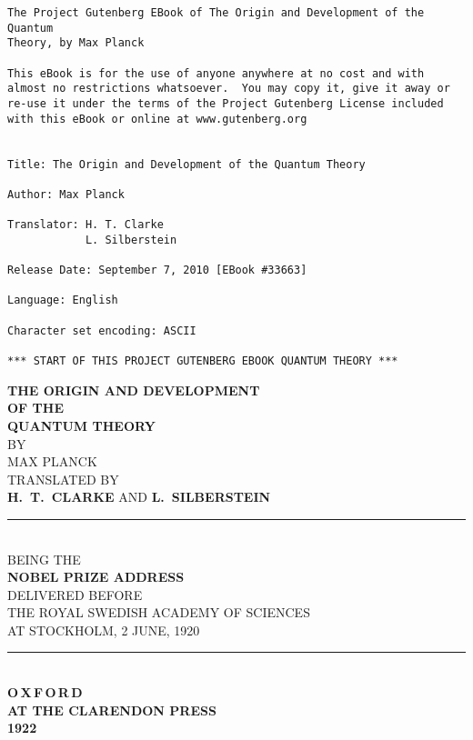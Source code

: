 \documentclass[12pt,oneside]{book}
\begin{document}

\begin{verbatim}
The Project Gutenberg EBook of The Origin and Development of the Quantum
Theory, by Max Planck

This eBook is for the use of anyone anywhere at no cost and with
almost no restrictions whatsoever.  You may copy it, give it away or
re-use it under the terms of the Project Gutenberg License included
with this eBook or online at www.gutenberg.org


Title: The Origin and Development of the Quantum Theory

Author: Max Planck

Translator: H. T. Clarke
            L. Silberstein

Release Date: September 7, 2010 [EBook #33663]

Language: English

Character set encoding: ASCII

*** START OF THIS PROJECT GUTENBERG EBOOK QUANTUM THEORY ***
\end{verbatim}

\mainmatter
{}

\begin{center}
\textbf{\Large THE ORIGIN AND DEVELOPMENT}\\
\vspace{8mm}
\textbf{OF THE}\\
\vspace{8mm}
\textbf{\Huge QUANTUM THEORY}\\
\vspace{10mm}
BY\\
\vspace{5mm}
{\Large MAX PLANCK}\\
\vspace{10mm}
TRANSLATED BY\\
\vspace{5mm}
\textbf{H.~T.~CLARKE} {\scriptsize AND} \textbf{L.~SILBERSTEIN}\\
\vspace{7mm}
\rule{30mm}{0.3mm}\\
\vspace{7mm}
{\small BEING THE}\\
\vspace{5mm}
\textbf{\large NOBEL PRIZE ADDRESS}\\
\vspace{5mm}
{\small DELIVERED BEFORE}\\
\vspace{5mm}
THE ROYAL SWEDISH ACADEMY OF SCIENCES\\
\vspace{5mm}
AT STOCKHOLM, 2 JUNE, 1920\\
\vspace{7mm}
\rule{30mm}{0.3mm}\\
\vspace{7mm}
\textbf{O$\,$X$\,$F$\,$O$\,$R$\,$D}\\
\vspace{4mm}
\textbf{AT THE CLARENDON PRESS}\\
\vspace{4mm}
\textbf{1922}
\end{center}
\end{document}
